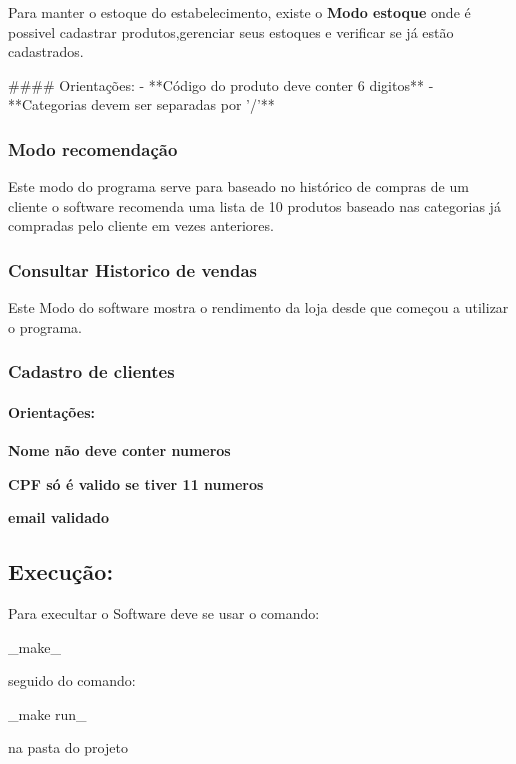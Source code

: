 Para manter o estoque do estabelecimento, existe o {\bfseries Modo estoque} onde é possivel cadastrar produtos,gerenciar seus estoques e verificar se já estão cadastrados. \begin{DoxyVerb}#### Orientações:
    - **Código do produto deve conter 6 digitos**
    - **Categorias devem ser separadas por '/'**
\end{DoxyVerb}


\subsubsection*{Modo recomendação}

Este modo do programa serve para baseado no histórico de compras de um cliente o software recomenda uma lista de 10 produtos baseado nas categorias já compradas pelo cliente em vezes anteriores.

\subsubsection*{Consultar Historico de vendas}

Este Modo do software mostra o rendimento da loja desde que começou a utilizar o programa.

\subsubsection*{Cadastro de clientes}

\paragraph*{Orientações\+:}


\begin{DoxyItemize}
\item {\bfseries Nome não deve conter numeros}
\item {\bfseries C\+PF só é valido se tiver 11 numeros}
\item {\bfseries email validado}
\end{DoxyItemize}

\subsection*{Execução\+:}

Para execultar o Software deve se usar o comando\+: \begin{DoxyVerb}        _make_ 
\end{DoxyVerb}
 seguido do comando\+: \begin{DoxyVerb}         _make run_ 
\end{DoxyVerb}


na pasta do projeto 